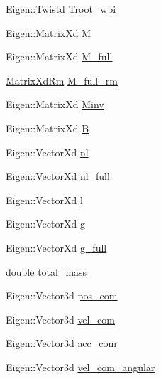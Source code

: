 \begin{DoxyCompactItemize}
\-Eigen\-::\-Twistd \hyperlink{structOcraWbiModel_1_1OcraWbiModel__pimpl_acd5e52a21301d36f453dd9a43fc6f50b}{\-Troot\-\_\-wbi}
\item 
\-Eigen\-::\-Matrix\-Xd \hyperlink{structOcraWbiModel_1_1OcraWbiModel__pimpl_a56b6cb4adf9dead06b4d09fe38daa26e}{\-M}
\item 
\-Eigen\-::\-Matrix\-Xd \hyperlink{structOcraWbiModel_1_1OcraWbiModel__pimpl_af57ebe4c5c15477a9592dd91a5c96f12}{\-M\-\_\-full}
\item 
\hyperlink{namespaceocra__icub_aa5e36a19ed031c28ca83c207bd7dd83f}{\-Matrix\-Xd\-Rm} \hyperlink{structOcraWbiModel_1_1OcraWbiModel__pimpl_a6ed8d69d83b0321920c0f79cf8e58bde}{\-M\-\_\-full\-\_\-rm}
\item 
\-Eigen\-::\-Matrix\-Xd \hyperlink{structOcraWbiModel_1_1OcraWbiModel__pimpl_a4d95e99d368b2e61c2945c1eeabff823}{\-Minv}
\item 
\-Eigen\-::\-Matrix\-Xd \hyperlink{structOcraWbiModel_1_1OcraWbiModel__pimpl_a71a78aa74a5b1422df339991ea6c6974}{\-B}
\item 
\-Eigen\-::\-Vector\-Xd \hyperlink{structOcraWbiModel_1_1OcraWbiModel__pimpl_aabdfee290923f49af80f11c524bae456}{nl}
\item 
\-Eigen\-::\-Vector\-Xd \hyperlink{structOcraWbiModel_1_1OcraWbiModel__pimpl_abea2880fe7e4fa2672ce55635ab9ea6c}{nl\-\_\-full}
\item 
\-Eigen\-::\-Vector\-Xd \hyperlink{structOcraWbiModel_1_1OcraWbiModel__pimpl_acc77ea549dd56164264c9436d8188b50}{l}
\item 
\-Eigen\-::\-Vector\-Xd \hyperlink{structOcraWbiModel_1_1OcraWbiModel__pimpl_ac9a96e0afe19e395bfadf4a21b6d0f5b}{g}
\item 
\-Eigen\-::\-Vector\-Xd \hyperlink{structOcraWbiModel_1_1OcraWbiModel__pimpl_a76adc7eb17d82f9234a4f130c2712be5}{g\-\_\-full}
\item 
double \hyperlink{structOcraWbiModel_1_1OcraWbiModel__pimpl_a992e0b522d3e3b9206f90dbcdd4727cf}{total\-\_\-mass}
\item 
\-Eigen\-::\-Vector3d \hyperlink{structOcraWbiModel_1_1OcraWbiModel__pimpl_acc028d57a70c3b36838f28ea518f65c4}{pos\-\_\-com}
\item 
\-Eigen\-::\-Vector3d \hyperlink{structOcraWbiModel_1_1OcraWbiModel__pimpl_a96c3cdb51b2a2b69c0738605c30e1b2e}{vel\-\_\-com}
\item 
\-Eigen\-::\-Vector3d \hyperlink{structOcraWbiModel_1_1OcraWbiModel__pimpl_ac7d61b2e1fff0ce7f15a472c6785f640}{acc\-\_\-com}
\item 
\-Eigen\-::\-Vector3d \hyperlink{structOcraWbiModel_1_1OcraWbiModel__pimpl_a696d73e62837978589a2730c8feb325c}{vel\-\_\-com\-\_\-angular}

\end{DoxyCompactItemize}
